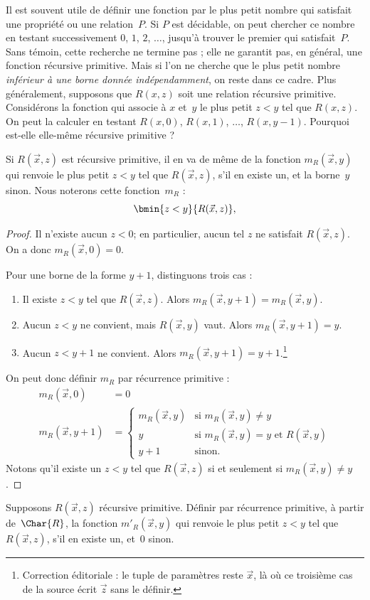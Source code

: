 \documentclass[../../../include/open-logic-section]{subfiles}
\begin{document}

\begin{explain}
Il est souvent utile de définir une fonction par le plus petit
nombre qui satisfait une propriété ou une relation~$P$. Si
$P$ est décidable, on peut chercher ce nombre en testant
successivement $0$, $1$, $2$, $\dots$, jusqu'à trouver le
premier qui satisfait~$P$. Sans témoin, cette recherche ne termine pas ;
elle ne garantit pas, en général, une fonction récursive primitive.
Mais si l'on ne cherche que le plus petit nombre
\emph{inférieur à une borne donnée indépendamment}, on reste
dans ce cadre. Plus généralement, supposons que $R(x,z)$
soit une relation récursive primitive. Considérons la
fonction qui associe à $x$ et~$y$ le plus petit $z<y$
tel que $R(x,z)$. On peut la calculer en testant
$R(x,0)$, $R(x,1)$, $\dots$, $R(x,y-1)$.
Pourquoi est-elle elle-même récursive primitive ?
\end{explain}

\begin{prop}
Si $R(\vec x,z)$ est récursive primitive, il en va de même
de la fonction $m_R(\vec{x},y)$ qui renvoie le plus petit
$z<y$ tel que $R(\vec x,z)$, s'il en existe un, et
la borne~$y$ sinon. Nous noterons cette fonction~$m_R$ :
\[
\bmin{z < y}{R(\vec{x}, z)},
\]
\end{prop}

\begin{proof}
Il n'existe aucun $z<0$; en particulier, aucun tel
$z$ ne satisfait $R(\vec x,z)$. On a donc
$m_R(\vec x,0)=0$.

Pour une borne de la forme $y+1$, distinguons trois cas :
\begin{enumerate}
\item Il existe $z<y$ tel que $R(\vec x,z)$.
Alors $m_R(\vec x,y+1)=m_R(\vec x,y)$.
\item Aucun $z<y$ ne convient, mais $R(\vec x,y)$
vaut. Alors $m_R(\vec x,y+1)=y$.
\item Aucun $z<y+1$ ne convient. Alors
$m_R(\vec x,y+1)=y+1$.\footnote{Correction éditoriale : le tuple de paramètres reste $\vec x$, là où ce troisième cas de la source écrit $\vec z$ sans le définir.}
\end{enumerate}
On peut donc définir $m_R$ par récurrence primitive :
\begin{align*}
m_R(\vec{x}, 0) & = 0\\
m_R(\vec{x}, y+1) & =
\begin{cases}
m_R(\vec{x}, y) & \text{si $m_R(\vec x,y)\neq y$}\\
y & \text{si $m_R(\vec x,y)=y$ et $R(\vec{x},y)$}\\
y+1 & \text{sinon.}
\end{cases}
\end{align*}
Notons qu'il existe un $z<y$ tel que $R(\vec x,z)$
si et seulement si $m_R(\vec x,y)\neq y$.
\end{proof}

\begin{prob}
Supposons $R(\vec x,z)$ récursive primitive. Définir
par récurrence primitive, à partir de~$\Char{R}$,
la fonction $m'_R(\vec{x},y)$ qui renvoie le plus
petit $z<y$ tel que $R(\vec x,z)$, s'il en existe un,
et~$0$ sinon.
\end{prob}
\end{document}
